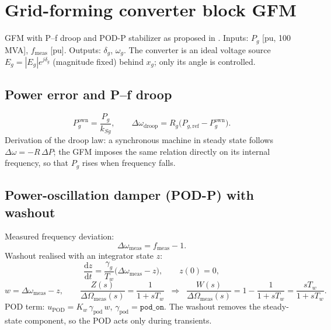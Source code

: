 \documentclass[11pt,a4paper]{article}
\numberwithin{equation}{section}
\newcommand{\dd}{\mathrm{d}}
\newcommand{\blk}[1]{\textsf{#1}}
\begin{document}
\section{Grid-forming converter block \blk{GFM}}
%
\noindent GFM with P--f droop and POD-P stabilizer as proposed in \cite{RA2021access,RA2023chapter}.
Inputs: $P_g$ [pu, 100 MVA], $f_{\text{meas}}$ [pu]. Outputs: $\delta_g$, $\omega_g$.
The converter is an ideal voltage source $E_g = |E_g|e^{j\delta_g}$ (magnitude fixed) behind $x_g$; only its angle is controlled.

\subsection{Power error and P--f droop}
\begin{equation}
P_g^{\text{own}} = \frac{P_g}{k_{Sg}},\qquad
\Delta\omega_{\text{droop}} = R_g\big(P_{g,\text{ref}} - P_g^{\text{own}}\big).
\end{equation}
Derivation of the droop law: a synchronous machine in steady state follows $\Delta\omega = -R\,\Delta P$; the GFM imposes the same relation directly on its internal frequency, so that $P_g$ rises when frequency falls.

\subsection{Power-oscillation damper (POD-P) with washout}
Measured frequency deviation:
\begin{equation}
\Delta\omega_{\text{meas}} = f_{\text{meas}} - 1 .
\end{equation}
Washout realised with an integrator state $z$:
\begin{equation}
\boxed{\frac{\dd z}{\dd t} = \frac{\gamma_g}{T_w}\big(\Delta\omega_{\text{meas}} - z\big),\qquad z(0)=0,}
\end{equation}
\begin{equation}
w = \Delta\omega_{\text{meas}} - z,\qquad
\frac{Z(s)}{\Delta\Omega_{\text{meas}}(s)} = \frac{1}{1+sT_w}
\;\;\Longrightarrow\;\;
\frac{W(s)}{\Delta\Omega_{\text{meas}}(s)} = 1-\frac{1}{1+sT_w} = \frac{sT_w}{1+sT_w}.
\end{equation}
POD term: $u_{\text{POD}} = K_w\,\gamma_{\text{pod}}\,w$, $\gamma_{\text{pod}} = \texttt{pod\_on}$. The washout removes the steady-state component, so the POD acts only during transients.
\end{document}
